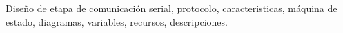 Diseño de etapa de comunicación serial, protocolo, caracteristicas, máquina de estado, diagramas, variables, recursos, descripciones.